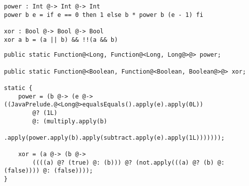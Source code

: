 \vspace{4mm}
\begin{lstlisting}[caption={If e operatori booleani in \textbf{Funx}}, style=funxCode, label={lst:4-2-ternary-funx}]
power : Int @-> Int @-> Int
power b e = if e == 0 then 1 else b * power b (e - 1) fi

xor : Bool @-> Bool @-> Bool
xor a b = (a || b) && !!(a && b)
\end{lstlisting}
\vspace{4mm}
\begin{lstlisting}[caption={Corrispondenti operatori ternari in \texttt{Java}}, style=javaCode, label={lst:4-2-ternary-java}]
public static Function@<Long, Function@<Long, Long@>@> power;

public static Function@<Boolean, Function@<Boolean, Boolean@>@> xor;

static {
    power = (b @-> (e @-> ((JavaPrelude.@<Long@>equalsEquals().apply(e).apply(0L))
        @? (1L)
        @: (multiply.apply(b)
            .apply(power.apply(b).apply(subtract.apply(e).apply(1L)))))));

    xor = (a @-> (b @->
        ((((a) @? (true) @: (b))) @? (not.apply(((a) @? (b) @: (false)))) @: (false))));
}
\end{lstlisting}
